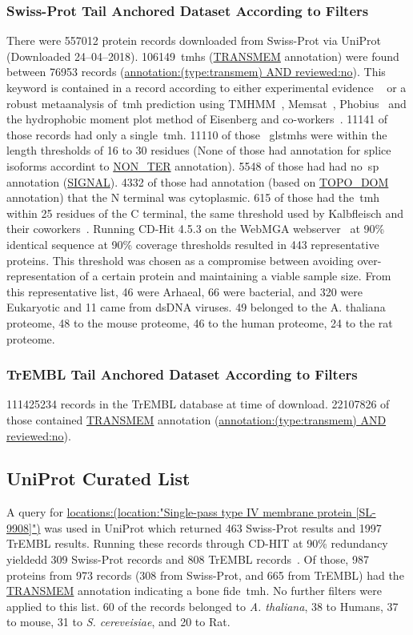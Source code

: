 \subsubsection{Swiss-Prot Tail Anchored Dataset According to Filters}
There were 557012 protein records downloaded from Swiss-Prot via UniProt~\cite{TheUniProtConsortium2014} (Downloaded 24--04--2018).
106149~\gls{tmh}s (\url{TRANSMEM} annotation) were found between 76953 records (\url{annotation:(type:transmem) AND reviewed:no}).
This keyword is contained in a record according to either experimental evidence ~\cite{TheUniProtConsortium2014} or a robust metaanalysis of~\gls{tmh} prediction using TMHMM~\cite{Krogh2001}, Memsat~\cite{Jones2007}, Phobius~\cite{Kall2004,Kall2007} and the hydrophobic moment plot method of Eisenberg and co-workers~\cite{Eisenberg1984}.
11141 of those records had only a single~\gls{tmh}.
11110 of those ~gls{tmh}s were within the length thresholds of 16 to 30 residues (None of those had annotation for splice isoforms accordint to \url{NON_TER} annotation).
5548 of those had had no~\gls{sp} annotation (\url{SIGNAL}).
4332 of those had annotation (based on \url{TOPO_DOM} annotation) that the N terminal was cytoplasmic.
615 of those had the~\gls{tmh} within 25 residues of the C terminal, the same threshold used by Kalbfleisch and their coworkers~\cite{Kalbfleisch2007}.
Running CD-Hit 4.5.3 on the WebMGA webserver~\cite{Huang2010, Wu2011} at 90\% identical sequence at 90\% coverage thresholds resulted in 443 representative proteins. This threshold was chosen as a compromise between avoiding over-representation of a certain protein and maintaining a viable sample size.
From this representative list, 46 were Arhaeal, 66 were bacterial, and 320 were Eukaryotic and 11 came from dsDNA viruses.
49 belonged to the A. thaliana proteome, 48 to the mouse proteome, 46 to the human proteome, 24 to the rat proteome.

\subsubsection{TrEMBL Tail Anchored Dataset According to Filters}
111425234 records in the TrEMBL database at time of download.
22107826 of those contained \url{TRANSMEM} annotation (\url{annotation:(type:transmem) AND reviewed:no}).


\subsection{UniProt Curated List}
A query for \url{locations:(location:"Single-pass type IV membrane protein [SL-9908]")} was used in UniProt which returned 463 Swiss-Prot results and 1997 TrEMBL results.
Running these records through CD-HIT at 90\% redundancy yieldedd 309 Swiss-Prot records and 808 TrEMBL records~\cite{Huang2010, Wu2011}.
Of those, 987 proteins from 973 records (308 from Swiss-Prot, and 665 from TrEMBL) had the \url{TRANSMEM} annotation indicating a bone fide~\gls{tmh}.
No further filters were applied to this list.
60 of the records belonged to \textit{A. thaliana}, 38 to Humans, 37 to mouse, 31 to \textit{S. cereveisiae}, and 20 to Rat.


